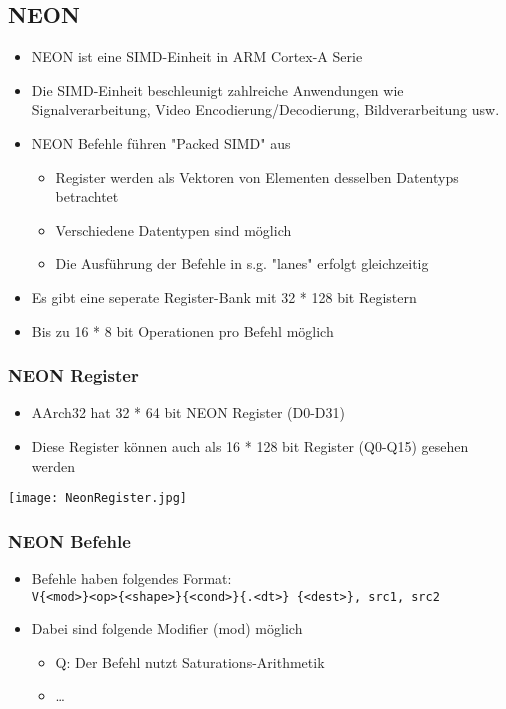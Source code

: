 	
	\subsection{NEON}
		\begin{itemize}
			\item NEON ist eine SIMD-Einheit in ARM Cortex-A Serie
			\item Die SIMD-Einheit beschleunigt zahlreiche Anwendungen wie Signalverarbeitung,
				Video Encodierung/Decodierung, Bildverarbeitung usw.
			\item NEON Befehle führen "Packed SIMD" aus
				\begin{itemize}
					\item Register werden als Vektoren von Elementen desselben Datentyps betrachtet
					\item Verschiedene Datentypen sind möglich
					\item Die Ausführung der Befehle in s.g. "lanes" erfolgt gleichzeitig
				\end{itemize}
			\item Es gibt eine seperate Register-Bank mit 32 * 128 bit Registern
			\item Bis zu 16 * 8 bit Operationen pro Befehl möglich
		\end{itemize}

		
		\subsubsection{NEON Register}
			\begin{minipage}{0.5\textwidth}
				\begin{itemize}
					\item AArch32 hat 32 * 64 bit NEON Register (D0-D31)
					\item Diese Register können auch als 16 * 128 bit Register (Q0-Q15) gesehen werden 
				\end{itemize}
			\end{minipage}
			\begin{minipage}{0.45\textwidth}
				\centerline{\texttt{[image: NeonRegister.jpg]}}
			\end{minipage}


		\subsubsection{NEON Befehle}
			\begin{itemize}
				\item Befehle haben folgendes Format: \\
					\texttt{V\{<mod>\}<op>\{<shape>\}\{<cond>\}\{.<dt>\} \{<dest>\}, src1, src2}
				\item Dabei sind folgende Modifier (mod) möglich
					\begin{itemize}
						\item Q: Der Befehl nutzt Saturations-Arithmetik
						\item \dots
					\end{itemize}
			\end{itemize}


